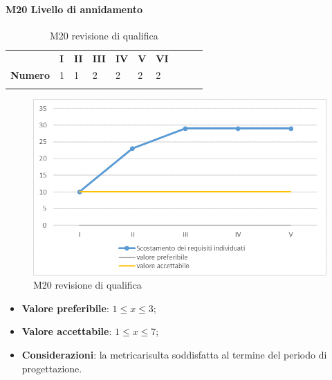 \begin{itemize}
\begin{itemize}
\paragraph{M20 Livello di annidamento} \mbox{}
\begin{longtable}[H!] {						
		>{}p{50mm}  		
		>{}p{8mm}
		>{}p{8mm}		
		>{}p{8mm}		
		>{}p{8mm}		
		>{}p{8mm}		
		>{}p{8mm}
		>{}p{8mm}
		>{}p{8mm}
		>{}p{8mm}
	}
	\rowcolor{gray!50}
	\textbf{} & \textbf{I} & \textbf{II} & \textbf{III} & \textbf{IV} & \textbf{V} & \textbf{VI} \TBstrut \\ [2mm]
	\textbf{Numero} & 1 & 1 & 2 & 2 & 2 & 2 \TBstrut \\ [2mm]
	\rowcolor{white}
	\caption{M20 revisione di qualifica}
\end{longtable}
\begin{figure}[H] 	
	\includegraphics[width=\linewidth]{./img/grafici/RP1.png}	
	\caption{M20 revisione di qualifica}	
\end{figure}
\begin{itemize}
	\item \textbf{Valore preferibile}: $1\le x \le 3$;
	\item \textbf{Valore accettabile}: $1 \le x \le 7$;
	\item \textbf{Considerazioni}: la metrica\glosp risulta soddisfatta al termine del periodo di progettazione\glo.
\end{itemize}


\end{itemize}
\end{itemize}
